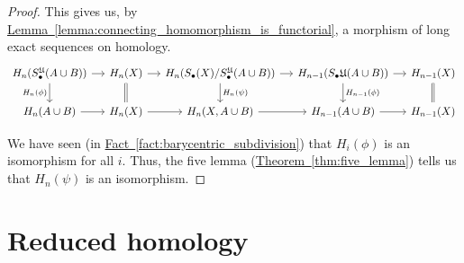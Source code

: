 \documentclass[main.tex]{subfiles}
\begin{document}
\begin{proof}
  This gives us, by \hyperref[lemma:connecting_homomorphism_is_functorial]{Lemma~\ref*{lemma:connecting_homomorphism_is_functorial}}, a morphism of long exact sequences on homology.
  \begin{equation*}
    \begin{tikzcd}[column sep=small]
      H_{n}(S_{\bullet}^{\mathfrak{U}}(A \cup B))
      \arrow[r]
      \arrow[d, swap, "H_{n}(\phi)"]
      & H_{n}(X)
      \arrow[r]
      \arrow[d, equals]
      & H_{n}(S_{\bullet}(X)/S_{\bullet}^{\mathfrak{U}}(A \cup B))
      \arrow[r]
      \arrow[d, "H_{n}(\psi)"]
      & H_{n-1}(S_{\bullet}\mathfrak{U}(A \cup B))
      \arrow[r]
      \arrow[d, "H_{n-1}(\phi)"]
      & H_{n-1}(X)
      \arrow[d, equals]
      \\
      H_{n}(A \cup B)
      \arrow[r]
      & H_{n}(X)
      \arrow[r]
      & H_{n}(X, A \cup B)
      \arrow[r]
      & H_{n-1}(A \cup B)
      \arrow[r]
      & H_{n-1}(X)
    \end{tikzcd}
  \end{equation*}

  We have seen (in \hyperref[fact:barycentric_subdivision]{Fact~\ref*{fact:barycentric_subdivision}}) that $H_{i}(\phi)$ is an isomorphism for all $i$. Thus, the five lemma (\hyperref[thm:five_lemma]{Theorem~\ref*{thm:five_lemma}}) tells us that $H_{n}(\psi)$ is an isomorphism.
\end{proof}

\section{Reduced homology}
\label{sec:reduced_homology}
\end{document}
